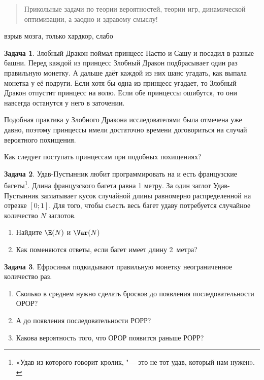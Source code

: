 \documentclass[11pt]{article}
\theoremstyle{definition} %
\newtheorem{zadacha}{Задача}
\begin{document}


\DoFirstPageTechnicalStuff


\begin{abstract}
Прикольные задачи по теории вероятностей, теории игр, динамической оптимизации, а заодно и здравому смыслу!
\end{abstract}

\begin{keyword}
взрыв мозга, только хардкор, слабо
\end{keyword}


\begin{zadacha}
Злобный Дракон поймал принцесс Настю и Сашу и посадил в разные башни. Перед каждой из принцесс Злобный Дракон подбрасывает один раз правильную монетку. А дальше даёт каждой из них шанс угадать, как выпала монетка у её подруги. Если хотя бы одна из принцесс угадает, то Злобный Дракон отпустит принцесс на волю. Если обе принцессы ошибутся, то они навсегда останутся у него в заточении.

Подобная практика у Злобного Дракона исследователями была отмечена уже давно, поэтому принцессы имели достаточно времени договориться на случай вероятного похищения.

Как следует поступать принцессам при подобных похищениях?
\end{zadacha}

\begin{zadacha}
Удав-Пустынник любит программировать на  и есть французские багеты\footnote{«Удав из которого говорит кролик, "--- это не тот удав, который нам нужен». \citep{iskander:kroliki}}. Длина французского багета равна 1 метру. За один заглот Удав-Пустынник заглатывает кусок случайной длины равномерно распределенной на отрезке $[0;1]$. Для того, чтобы съесть весь багет удаву потребуется случайное количество $N$ заглотов. 
\begin{enumerate}
\item Найдите $\E(N)$ и $\Var(N)$
\item Как поменяются ответы, если багет имеет длину 2~метра?
\end{enumerate}
\end{zadacha}

\begin{zadacha}
Ефросинья подкидывают правильную монетку неограниченное количество раз. 

\begin{enumerate}
\item Сколько в среднем нужно сделать бросков до появления последовательности ОРОР? 
\item А до появления последовательности РОРР?
\item Какова вероятность того, что ОРОР появится раньше РОРР?
\end{enumerate}

\end{zadacha}
\end{document}
